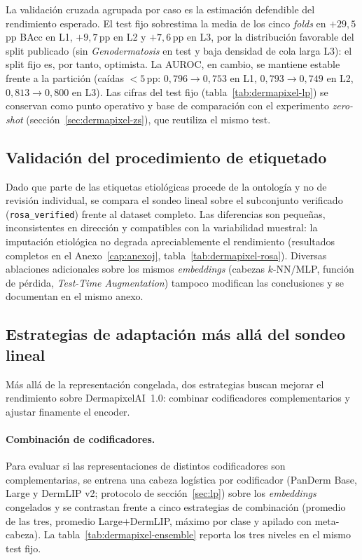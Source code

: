 La validación cruzada agrupada por caso es la estimación defendible
del rendimiento esperado. El test fijo sobrestima la media de los
cinco \emph{folds} en $+29{,}5$\,pp BAcc en L1, $+9{,}7$\,pp en L2 y
$+7{,}6$\,pp en L3, por la distribución favorable del split publicado
(sin \emph{Genodermatosis} en test y baja densidad de cola larga L3):
el split fijo es, por tanto, optimista. La AUROC, en cambio, se
mantiene estable frente a la partición (caídas $<5$\,pp:
$0{,}796 \to 0{,}753$ en L1, $0{,}793 \to 0{,}749$ en L2,
$0{,}813 \to 0{,}800$ en L3). Las cifras del test fijo
(tabla~\ref{tab:dermapixel-lp}) se conservan como punto operativo y
base de comparación con el experimento \emph{zero-shot}
(sección~\ref{sec:dermapixel-zs}), que reutiliza el mismo test.


\subsection{Validación del procedimiento de etiquetado}

Dado que parte de las etiquetas etiológicas procede de la ontología y
no de revisión individual, se compara el sondeo lineal sobre el
subconjunto verificado (\texttt{rosa\_verified}) frente al dataset
completo. Las diferencias son pequeñas, inconsistentes en dirección y
compatibles con la variabilidad muestral: la imputación etiológica no
degrada apreciablemente el rendimiento (resultados completos en el
Anexo~\ref{cap:anexoj}, tabla~\ref{tab:dermapixel-rosa}). Diversas
ablaciones adicionales sobre los mismos \emph{embeddings} (cabezas
$k$-NN/MLP, función de pérdida, \emph{Test-Time Augmentation}) tampoco
modifican las conclusiones y se documentan en el mismo anexo.


\subsection{Estrategias de adaptación más allá del sondeo lineal}
\label{sec:dermapixel-ensemble}

Más allá de la representación congelada, dos estrategias buscan mejorar
el rendimiento sobre DermapixelAI~1.0: combinar codificadores
complementarios y ajustar finamente el encoder.

\paragraph{Combinación de codificadores.}
Para evaluar si las representaciones de distintos codificadores son
complementarias, se entrena una cabeza logística por codificador
(PanDerm Base, Large y DermLIP v2; protocolo de sección~\ref{sec:lp})
sobre los \emph{embeddings} congelados y se contrastan frente a cinco
estrategias de combinación (promedio de las tres, promedio
Large$+$DermLIP, máximo por clase y apilado con meta-cabeza). La
tabla~\ref{tab:dermapixel-ensemble} reporta los tres niveles en el
mismo test fijo.

